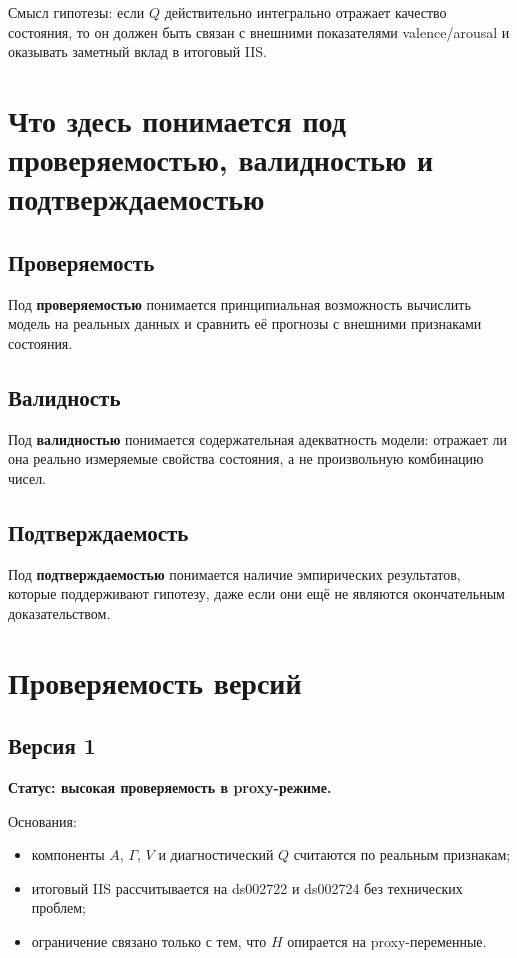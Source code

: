 \documentclass[12pt,a4paper]{article}
\begin{document}
Смысл гипотезы: если $Q$ действительно интегрально отражает качество состояния, то он должен быть связан с внешними показателями valence/arousal и оказывать заметный вклад в итоговый IIS.

\section{Что здесь понимается под проверяемостью, валидностью и подтверждаемостью}
\subsection{Проверяемость}
Под \textbf{проверяемостью} понимается принципиальная возможность вычислить модель на реальных данных и сравнить её прогнозы с внешними признаками состояния.

\subsection{Валидность}
Под \textbf{валидностью} понимается содержательная адекватность модели: отражает ли она реально измеряемые свойства состояния, а не произвольную комбинацию чисел.

\subsection{Подтверждаемость}
Под \textbf{подтверждаемостью} понимается наличие эмпирических результатов, которые поддерживают гипотезу, даже если они ещё не являются окончательным доказательством.

\section{Проверяемость версий}
\subsection{Версия 1}
\textbf{Статус: высокая проверяемость в proxy-режиме.}

Основания:
\begin{itemize}[leftmargin=1.25cm]
    \item компоненты $A$, $\Gamma$, $V$ и диагностический $Q$ считаются по реальным признакам;
    \item итоговый IIS рассчитывается на ds002722 и ds002724 без технических проблем;
    \item ограничение связано только с тем, что $H$ опирается на proxy-переменные.
\end{itemize}
\end{document}

